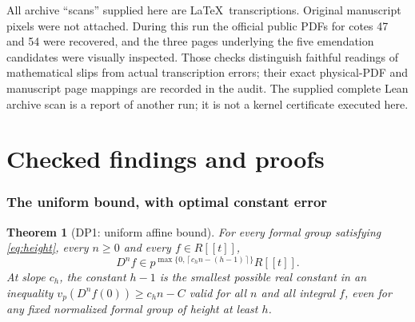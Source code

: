 \documentclass[11pt,a4paper]{article}
\newtheorem{theorem}{Theorem}[section]
\theoremstyle{definition}\newtheorem{remark}[theorem]{Remark}
\newcommand{\vp}{v_p}\newcommand{\dR}{\mathrm{dR}}\newcommand{\crys}{\mathrm{crys}}
\newcommand{\ceil}[1]{\left\lceil #1\right\rceil}\newcommand{\floor}[1]{\left\lfloor #1\right\rfloor}
\begin{document}
All archive ``scans'' supplied here are \LaTeX\ transcriptions. Original manuscript pixels were not attached. During this run the official public PDFs for cotes 47 and 54 were recovered, and the three pages underlying the five emendation candidates were visually inspected. Those checks distinguish faithful readings of mathematical slips from actual transcription errors; their exact physical-PDF and manuscript page mappings are recorded in the audit. The supplied complete Lean archive scan is a report of another run; it is not a kernel certificate executed here.

\part{Checked findings and proofs}

\section{The uniform bound, with optimal constant error}

\begin{theorem}[DP1: uniform affine bound]\label{DP1}
For every formal group satisfying \eqref{eq:height}, every $n\ge0$ and every $f\in R[[t]]$,
\begin{equation}\label{eq:affine}
 D^n f\in p^{\max\{0,\ceil{c_hn-(h-1)}\}}R[[t]].
\end{equation}
At slope $c_h$, the constant $h-1$ is the smallest possible real constant in an inequality $\vp(D^nf(0))\ge c_hn-C$ valid for all $n$ and all integral $f$, even for any fixed normalized formal group of height at least $h$.
\end{theorem}
\end{document}
